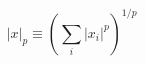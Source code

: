 \documentclass{article}
\begin{document}
 
\[
\left| x \right|_p \equiv \left( \sum_i \left|x_i\right|^p \right)^{1/p}
\]
 \newpage 
\end{document}
